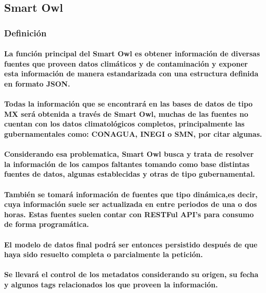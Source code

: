 \subsection{Smart Owl}
  \subsubsection{Definición}
  \paragraph{La función principal del Smart Owl es obtener información de diversas fuentes que proveen datos climáticos y de contaminación y exponer esta información de manera estandarizada con una estructura definida en formato JSON.}
  \paragraph{Todas la información que se encontrará en las bases de datos de tipo MX será obtenida a través de Smart Owl, muchas de las fuentes no cuentan con los datos climatológicos completos, principalmente las gubernamentales como: CONAGUA, INEGI o SMN, por citar algunas.}
  \paragraph{Considerando esa problematica, Smart Owl busca y trata de resolver la información de los campos faltantes tomando como base distintas fuentes de datos, algunas establecidas y otras de tipo gubernamental.}
  \paragraph{También se tomará información de fuentes que tipo dinámica,es decir, cuya información suele ser actualizada en entre periodos de una o dos horas. Estas fuentes suelen contar con RESTFul API's para consumo de forma programática.}
  \paragraph{El modelo de datos final podrá ser entonces persistido después de que haya sido resuelto completa o parcialmente la petición.} 
  \paragraph{Se llevará el control de los metadatos considerando su origen, su fecha y algunos tags relacionados los que proveen la información.}

